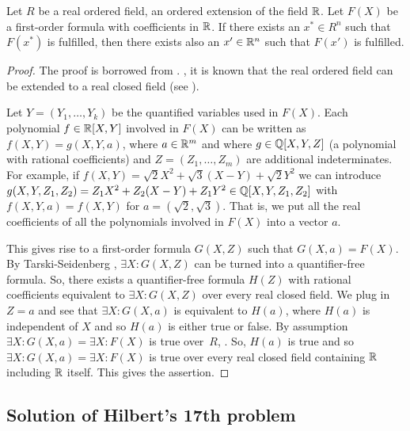 \begin{corollary}  
	\label{cor:tarski}
	Let $R$ be a real ordered field,  an ordered extension of the field $\mathbb{R}$. Let $F(X)$ be a first-order formula with coefficients in $\mathbb{R}$. If there exists an $x^\ast \in R^n$ such that $F(x^\ast)$ is fulfilled, then there exists also an $x' \in \mathbb{R}^n$ such that $F(x')$ is fulfilled. 
\end{corollary}
\begin{proof}
	The proof is borrowed from \cite[Cor.~1.4.7]{Bochnak:Coste:Roy:1998}. , it is known that the real ordered field  can be extended to a real closed field  (see \cite{Bochnak:Coste:Roy:1998}).
	
	Let $Y=(Y_1,\ldots,Y_k)$ be the quantified variables used in $F(X)$. 
	Each polynomial $f \in \mathbb{R}[X,Y]$ involved in $F(X)$ can be written as $f(X,Y) = g(X,Y,a)$, where $a \in \mathbb{R}^m$
	and where $g \in \mathbb{Q}[X,Y,Z]$ (a polynomial with rational coefficients) and $Z=(Z_1,\ldots,Z_m)$ are additional indeterminates. For example, if $f(X,Y) = \sqrt{2} X^2 + \sqrt{3} (X-Y) + \sqrt{2} Y^2$ we can introduce $g(X,Y,Z_1,Z_2) = Z_1 X^2 + Z_2 (X-Y) + Z_1 Y^2 \in \mathbb{Q}[X,Y,Z_1,Z_2]$ with $f(X,Y,a) = f(X,Y)$ for $a=(\sqrt{2},\sqrt{3})$.
		That is, we put all the real coefficients of all the polynomials involved in $F(X)$ into a vector $a$.
		
		This gives rise to a first-order formula $G(X,Z)$ such that $G(X,a) = F(X)$. By Tarski-Seidenberg , $\exists X : G(X,Z)$ can be turned into a quantifier-free formula. So, there exists a quantifier-free formula $H(Z)$ with rational coefficients equivalent to $\exists X : G(X,Z)$ over every real closed field. We plug in $Z=a$ and see that $\exists X : G(X,a)$ is equivalent to $H(a)$, where $H(a)$ is independent of $X$ and so $H(a)$ is either true or false. By assumption $\exists X : G(X,a) = \exists X : F(X)$ is true over~$R$, . So, $H(a)$ is true and so $\exists X : G(X,a) = \exists X : F(X)$ is true over every real closed field containing $\mathbb{R}$ including $\mathbb{R}$ itself. This gives the assertion. 
\end{proof}

\subsection{Solution of Hilbert's 17th problem}

